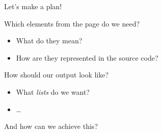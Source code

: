 \documentclass{beamer}
\begin{document}
{
\begin{frame}[plain]
\end{frame}
\begin{frame}[plain]
\end{frame}

\begin{frame}[plain]
\end{frame}
}


\begin{frame}{Let's make a plan!}
\begin{block}{Which elements from the page do we need?}
\begin{itemize}
\item What do they mean?
\item How are they represented in the source code?
\end{itemize}
\end{block}
\begin{block}{How should our output look like?}
\begin{itemize}
\item What \emph{lists} do we want?
\item \ldots
\end{itemize}
\end{block}
And how can we achieve this?
\end{frame}
\end{document}
